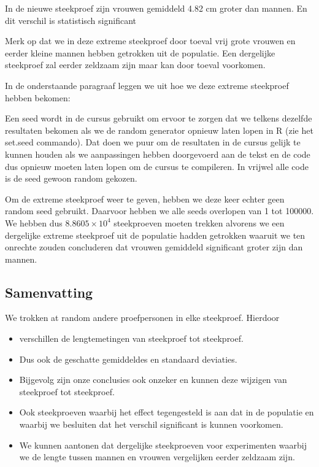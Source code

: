 \documentclass[
  12pt,dutch,coursenotes]{book}
\theoremstyle{definition}
\theoremstyle{definition}
\theoremstyle{definition}
\theoremstyle{remark}
\begin{document}
In de nieuwe steekproef zijn vrouwen gemiddeld 4.82 cm groter dan mannen. En dit verschil is statistisch significant

Merk op dat we in deze extreme steekproef door toeval vrij grote vrouwen en eerder kleine mannen hebben getrokken uit de populatie. Een dergelijke steekproef zal eerder zeldzaam zijn maar kan door toeval voorkomen.

In de onderstaande paragraaf leggen we uit hoe we deze extreme steekproef hebben bekomen:

Een seed wordt in de cursus gebruikt om ervoor te zorgen dat we telkens dezelfde resultaten bekomen als we de random generator opnieuw laten lopen in R (zie het set.seed commando). Dat doen we puur om de resultaten in de cursus gelijk te kunnen houden als we aanpassingen hebben doorgevoerd aan de tekst en de code dus opnieuw moeten laten lopen om de cursus te compileren. In vrijwel alle code is de seed gewoon random gekozen.

Om de extreme steekproef weer te geven, hebben we deze keer echter geen random seed gebruikt. Daarvoor hebben we alle seeds overlopen van 1 tot 100000. We hebben dus \ensuremath{8.8605\times 10^{4}} steekproeven moeten trekken alvorens we een dergelijke extreme steekproef uit de populatie hadden getrokken waaruit we ten onrechte zouden concluderen dat vrouwen gemiddeld significant groter zijn dan mannen.

\hypertarget{samenvatting}{%
\subsection{Samenvatting}\label{samenvatting}}

We trokken at random andere proefpersonen in elke steekproef. Hierdoor

\begin{itemize}
\item
  verschillen de lengtemetingen van steekproef tot steekproef.
\item
  Dus ook de geschatte gemiddeldes en standaard deviaties.
\item
  Bijgevolg zijn onze conclusies ook onzeker en kunnen deze wijzigen van steekproef tot steekproef.
\item
  Ook steekproeven waarbij het effect tegengesteld is aan dat in de populatie en waarbij we besluiten dat het verschil significant is kunnen voorkomen.
\item
  We kunnen aantonen dat dergelijke steekproeven voor experimenten waarbij we de lengte tussen mannen en vrouwen vergelijken eerder zeldzaam zijn.
\end{itemize}
\end{document}
